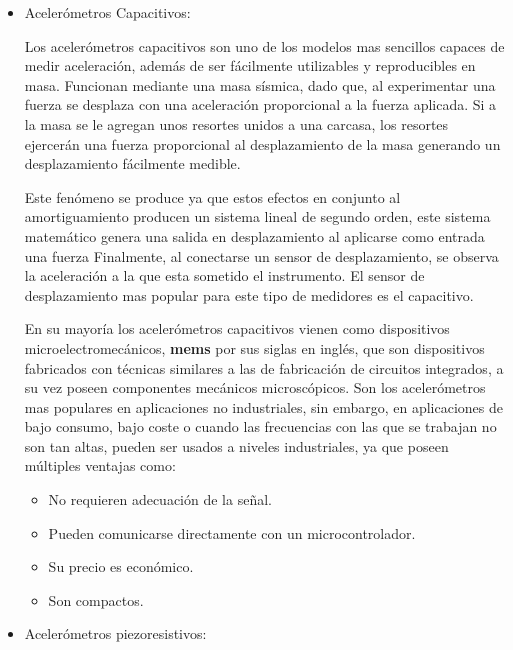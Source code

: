 \begin{itemize}
    \item  Acelerómetros Capacitivos:

        Los acelerómetros capacitivos son uno de los modelos mas sencillos
        capaces de medir
        aceleración, además de ser fácilmente utilizables y reproducibles en masa.
        Funcionan mediante una masa sísmica, dado que, al  experimentar una fuerza
        se desplaza con una aceleración proporcional a la fuerza aplicada.
        Si a la masa se le agregan unos resortes unidos a una carcasa, los resortes
        ejercerán una fuerza proporcional al desplazamiento de la masa generando un
        desplazamiento fácilmente medible.

        Este fenómeno se produce ya que estos efectos en conjunto al
        amortiguamiento producen un sistema lineal de
        segundo orden, este sistema matemático genera una salida en desplazamiento
        al aplicarse como entrada una fuerza
         Finalmente, al conectarse un sensor de desplazamiento, se observa
        la aceleración a la que esta sometido el instrumento.
        El sensor de desplazamiento mas
        popular para este tipo de medidores es el capacitivo.

        En su mayoría los acelerómetros capacitivos vienen como dispositivos
        microelectromecánicos, \textbf{mems} por sus siglas en inglés, que son
        dispositivos
        fabricados con técnicas similares a las de fabricación de circuitos
        integrados, a su vez poseen componentes mecánicos microscópicos. Son los
        acelerómetros mas populares en aplicaciones no industriales, sin embargo,
        en aplicaciones de bajo consumo, bajo coste o cuando las frecuencias con
        las que se trabajan no son tan altas, pueden ser usados a niveles
        industriales, ya que poseen múltiples ventajas como:

        \begin{itemize}[noitemsep]
            \item No requieren adecuación de la señal.
            \item Pueden comunicarse directamente con un microcontrolador.
            \item Su precio es económico.
            \item Son compactos.
        \end{itemize}


    \item  Acelerómetros piezoresistivos:


\end{itemize}
